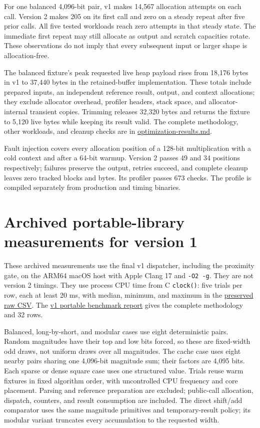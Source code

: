 \documentclass[11pt,a4paper]{article}
\begin{document}
For one balanced 4,096-bit pair, v1 makes 14,567 allocation attempts on each call. Version 2 makes 205 on its first call and zero on a steady repeat after five prior calls. All five tested workloads reach zero attempts in that steady state. The immediate first repeat may still allocate as output and scratch capacities rotate. These observations do not imply that every subsequent input or larger shape is allocation-free.

The balanced fixture's peak requested live heap payload rises from 18,176 bytes in v1 to 37,440 bytes in the retained-buffer implementation. These totals include prepared inputs, an independent reference result, output, and context allocations; they exclude allocator overhead, profiler headers, stack space, and allocator-internal transient copies. Trimming releases 32,320 bytes and returns the fixture to 5,120 live bytes while keeping its result valid. The complete methodology, other workloads, and cleanup checks are in \href{\detokenize{optimization-results.md}}{optimization-results.md}.

Fault injection covers every allocation position of a 128-bit multiplication with a cold context and after a 64-bit warmup. Version 2 passes 49 and 34 positions respectively; failures preserve the output, retries succeed, and complete cleanup leaves zero tracked blocks and bytes. Its profiler passes 673 checks. The profile is compiled separately from production and timing binaries.

\section{Archived portable-library measurements for version 1}

These archived measurements use the final v1 dispatcher, including the proximity gate, on the ARM64 macOS host with Apple Clang 17 and \texttt{-O2 -g}. They are not version 2 timings. They use process CPU time from C \texttt{clock()}: five trials per row, each at least 20 ms, with median, minimum, and maximum in the \href{\detokenize{.scratchpad/portable-v1/benchmarks.csv}}{preserved raw CSV}. The \href{\detokenize{portable-results.md}}{v1 portable benchmark report} gives the complete methodology and 32 rows.

Balanced, long-by-short, and modular cases use eight deterministic pairs. Random magnitudes have their top and low bits forced, so these are fixed-width odd draws, not uniform draws over all magnitudes. The cache case uses eight nearby pairs sharing one 4,096-bit magnitude sum; their factors are 4,095 bits. Each sparse or dense square case uses one structured value. Trials reuse warm fixtures in fixed algorithm order, with uncontrolled CPU frequency and core placement. Parsing and reference preparation are excluded; public-call allocation, dispatch, counters, and result consumption are included. The direct shift/add comparator uses the same magnitude primitives and temporary-result policy; its modular variant truncates every accumulation to the requested width.
\end{document}
